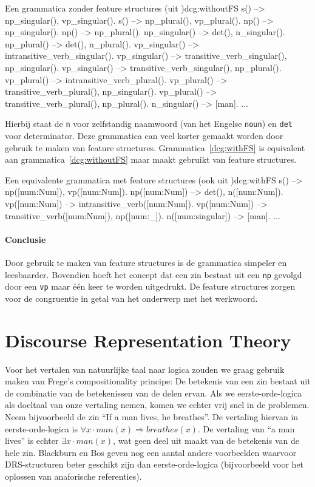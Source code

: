 \begin{dcg}{Een grammatica zonder feature structures (uit \cite{NLPCourse})}{dcg:withoutFS}
s() --> np_singular(), vp_singular().
s() --> np_plural(), vp_plural().
np() --> np_singular().
np() --> np_plural().
np_singular() --> det(), n_singular().
np_plural() --> det(), n_plural().
vp_singular() --> intransitive_verb_singular().
vp_singular() --> transitive_verb_singular(), np_singular().
vp_singular() --> transitive_verb_singular(), np_plural().
vp_plural() --> intransitive_verb_plural().
vp_plural() --> transitive_verb_plural(), np_singular().
vp_plural() --> transitive_verb_plural(), np_plural().
n_singular() --> [man].
...
\end{dcg}
Hierbij staat de \texttt{n} voor zelfstandig naamwoord (van het Engelse \texttt{noun}) en \texttt{det} voor determinator. Deze grammatica can veel korter gemaakt worden door gebruik te maken van feature structures. Grammatica~\ref{dcg:withFS} is equivalent aan grammatica~\ref{dcg:withoutFS} maar maakt gebruikt van feature structures.

\begin{dcg}{Een equivalente grammatica met feature structures (ook uit \cite{NLPCourse})}{dcg:withFS}
s() --> np([num:Num]), vp([num:Num]).
np([num:Num]) --> det(), n([num:Num]).
vp([num:Num]) --> intransitive_verb([num:Num]).
vp([num:Num]) --> transitive_verb([num:Num]), np([num:_]).
n([num:singular]) --> [man].
...
\end{dcg} 

\paragraph{Conclusie} Door gebruik te maken van feature structures is de grammatica simpeler en leesbaarder. Bovendien hoeft het concept dat een zin bestaat uit een \texttt{np} gevolgd door een \texttt{vp} maar \'e\'en keer te worden uitgedrukt. De feature structures zorgen voor de congruentie in getal van het onderwerp met het werkwoord. 

\section{Discourse Representation Theory}
Voor het vertalen van natuurlijke taal naar logica zouden we graag gebruik maken van Frege's compositionality principe: De betekenis van een zin bestaat uit de combinatie van de betekenissen van de delen ervan. Als we eerste-orde-logica als doeltaal van onze vertaling nemen, komen we echter vrij snel in de problemen. Neem bijvoorbeeld de zin ``If a man lives, he breathes''. De vertaling hiervan in eerste-orde-logica is $\forall x \cdot man(x) \Rightarrow breathes(x)$. De vertaling van ``a man lives'' is echter $\exists x \cdot man(x)$, wat geen deel uit maakt van de betekenis van de hele zin. Blackburn en Bos \cite{Blackburn2006} geven nog een aantal andere voorbeelden waarvoor DRS-structuren beter geschikt zijn dan eerste-orde-logica (bijvoorbeeld voor het oplossen van anaforische referenties).

